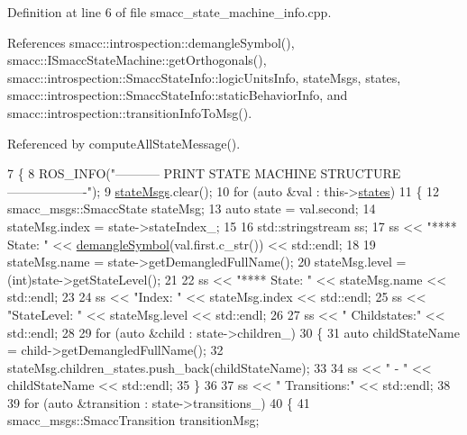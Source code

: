 Definition at line 6 of file smacc\+\_\+state\+\_\+machine\+\_\+info.\+cpp.



References smacc\+::introspection\+::demangle\+Symbol(), smacc\+::\+I\+Smacc\+State\+Machine\+::get\+Orthogonals(), smacc\+::introspection\+::\+Smacc\+State\+Info\+::logic\+Units\+Info, state\+Msgs, states, smacc\+::introspection\+::\+Smacc\+State\+Info\+::static\+Behavior\+Info, and smacc\+::introspection\+::transition\+Info\+To\+Msg().



Referenced by compute\+All\+State\+Message().


\begin{DoxyCode}
7 \{
8     ROS\_INFO(\textcolor{stringliteral}{"----------- PRINT STATE MACHINE STRUCTURE -------------------"});
9     \hyperlink{classsmacc_1_1introspection_1_1SmaccStateMachineInfo_a48e3ff7bbe2673d23e6942234446ebee}{stateMsgs}.clear();
10     \textcolor{keywordflow}{for} (\textcolor{keyword}{auto} &val : this->\hyperlink{classsmacc_1_1introspection_1_1SmaccStateMachineInfo_aef31d74ad3669f0b0f57fe0e008cd2f8}{states})
11     \{
12         smacc\_msgs::SmaccState stateMsg;
13         \textcolor{keyword}{auto} state = val.second;
14         stateMsg.index = state->stateIndex\_;
15 
16         std::stringstream ss;
17         ss << \textcolor{stringliteral}{"**** State: "} << \hyperlink{namespacesmacc_1_1introspection_a2f495108db3e57604d8d3ff5ef030302}{demangleSymbol}(val.first.c\_str()) << std::endl;
18 
19         stateMsg.name = state->getDemangledFullName();
20         stateMsg.level = (int)state->getStateLevel();
21 
22         ss << \textcolor{stringliteral}{"**** State: "} << stateMsg.name << std::endl;
23 
24         ss << \textcolor{stringliteral}{"Index: "} << stateMsg.index << std::endl;
25         ss << \textcolor{stringliteral}{"StateLevel: "} << stateMsg.level << std::endl;
26 
27         ss << \textcolor{stringliteral}{" Childstates:"} << std::endl;
28 
29         \textcolor{keywordflow}{for} (\textcolor{keyword}{auto} &child : state->children\_)
30         \{
31             \textcolor{keyword}{auto} childStateName = child->getDemangledFullName();
32             stateMsg.children\_states.push\_back(childStateName);
33 
34             ss << \textcolor{stringliteral}{" - "} << childStateName << std::endl;
35         \}
36 
37         ss << \textcolor{stringliteral}{" Transitions:"} << std::endl;
38 
39         \textcolor{keywordflow}{for} (\textcolor{keyword}{auto} &transition : state->transitions\_)
40         \{
41             smacc\_msgs::SmaccTransition transitionMsg;

\end{DoxyCode}
